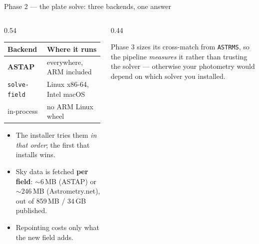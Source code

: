 \documentclass[10pt,aspectratio=169]{beamer}
\begin{document}
\begin{frame}{Phase 2 --- the plate solve: three backends, one answer}
  \begin{columns}[T]
    \begin{column}{0.54\textwidth}
      \footnotesize
      \begin{tabular}{@{}l l@{}}
        \toprule
        \textbf{Backend} & \textbf{Where it runs} \\
        \midrule
        \textbf{ASTAP} & everywhere, ARM included \\
        \texttt{solve-field} & Linux x86-64, Intel macOS \\
        in-process & no ARM Linux wheel \\
        \bottomrule
      \end{tabular}

      \vspace{0.7em}
      \begin{itemize}\footnotesize
        \item The installer tries them \emph{in that order}; the first that installs wins.
        \item Sky data is fetched \textbf{per field}: $\sim$6\,MB (ASTAP) or
              $\sim$246\,MB (Astrometry.net), out of 859\,MB / 34\,GB published.
        \item Repointing costs only what the new field adds.
      \end{itemize}
    \end{column}
    \begin{column}{0.44\textwidth}
      \centering

      \vspace{0.3em}
      {\scriptsize Phase 3 sizes its cross-match from \texttt{ASTRMS}, so the pipeline
      \emph{measures} it rather than trusting the solver --- otherwise your photometry
      would depend on which solver you installed.}
    \end{column}
  \end{columns}
\end{frame}
\end{document}
